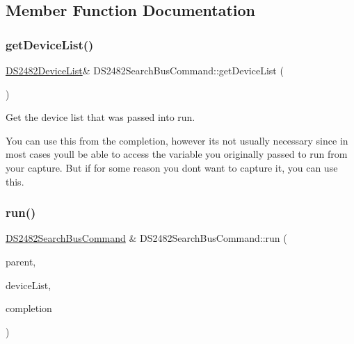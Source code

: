 \subsection{Member Function Documentation}
\mbox{\label{class_d_s2482_search_bus_command_acf9ce76a212b1a927180ba4391a90f54}} 
\subsubsection{\texorpdfstring{get\+Device\+List()}{getDeviceList()}}
{\footnotesize\ttfamily \mbox{\hyperlink{class_d_s2482_device_list}{D\+S2482\+Device\+List}}\& D\+S2482\+Search\+Bus\+Command\+::get\+Device\+List (\begin{DoxyParamCaption}{ }\end{DoxyParamCaption})\hspace{0.3cm}{\ttfamily [inline]}}



Get the device list that was passed into run. 

You can use this from the completion, however it\textquotesingle{}s not usually necessary since in most cases you\textquotesingle{}ll be able to access the variable you originally passed to run from your capture. But if for some reason you don\textquotesingle{}t want to capture it, you can use this. \mbox{\label{class_d_s2482_search_bus_command_ad45cdd2c6e517f13cf18bd28e58061bb}} 
\subsubsection{\texorpdfstring{run()}{run()}}
{\footnotesize\ttfamily \mbox{\hyperlink{class_d_s2482_search_bus_command}{D\+S2482\+Search\+Bus\+Command}} \& D\+S2482\+Search\+Bus\+Command\+::run (\begin{DoxyParamCaption}\item[{\mbox{\hyperlink{class_d_s2482}{D\+S2482}} \&}]{parent,  }\item[{\mbox{\hyperlink{class_d_s2482_device_list}{D\+S2482\+Device\+List}} \&}]{device\+List,  }\item[{std\+::function$<$ void(\mbox{\hyperlink{class_d_s2482_search_bus_command}{D\+S2482\+Search\+Bus\+Command}} \&, int status)$>$}]{completion }\end{DoxyParamCaption})\hspace{0.3cm}{\ttfamily [static]}}



